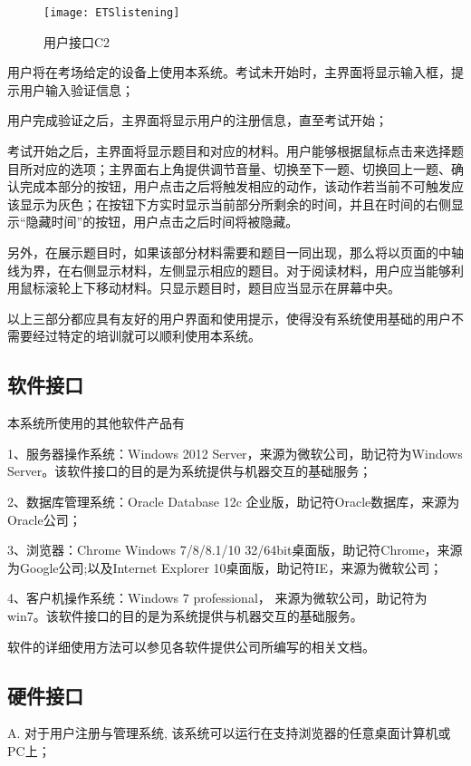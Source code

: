\begin{figure}[ht]
\centering
\texttt{[image: ETSlistening]}
\caption{用户接口C2}\label{fig:noted-figure}
\end{figure}

用户将在考场给定的设备上使用本系统。考试未开始时，主界面将显示输入框，提示用户输入验证信息；

用户完成验证之后，主界面将显示用户的注册信息，直至考试开始；

考试开始之后，主界面将显示题目和对应的材料。用户能够根据鼠标点击来选择题目所对应的选项；主界面右上角提供调节音量、切换至下一题、切换回上一题、确认完成本部分的按钮，用户点击之后将触发相应的动作，该动作若当前不可触发应该显示为灰色；在按钮下方实时显示当前部分所剩余的时间，并且在时间的右侧显示“隐藏时间”的按钮，用户点击之后时间将被隐藏。

另外，在展示题目时，如果该部分材料需要和题目一同出现，那么将以页面的中轴线为界，在右侧显示材料，左侧显示相应的题目。对于阅读材料，用户应当能够利用鼠标滚轮上下移动材料。只显示题目时，题目应当显示在屏幕中央。

以上三部分都应具有友好的用户界面和使用提示，使得没有系统使用基础的用户不需要经过特定的培训就可以顺利使用本系统。

\subsection{软件接口}
本系统所使用的其他软件产品有

1、服务器操作系统：Windows 2012 Server，来源为微软公司，助记符为Windows Server。该软件接口的目的是为系统提供与机器交互的基础服务；

2、数据库管理系统：Oracle Database 12c 企业版，助记符Oracle数据库，来源为Oracle公司；

3、浏览器：Chrome Windows 7/8/8.1/10 32/64bit桌面版，助记符Chrome，来源为Google公司;以及Internet Explorer 10桌面版，助记符IE，来源为微软公司；

4、客户机操作系统：Windows 7 professional， 来源为微软公司，助记符为win7。该软件接口的目的是为系统提供与机器交互的基础服务。

软件的详细使用方法可以参见各软件提供公司所编写的相关文档。

\subsection{硬件接口}
A. 对于用户注册与管理系统, 该系统可以运行在支持浏览器的任意桌面计算机或PC上；

